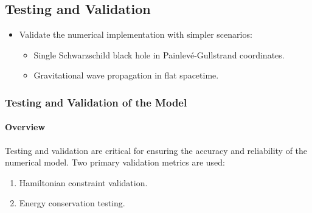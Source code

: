 \documentclass[12pt]{article}
\begin{document}
\subsection{Testing and Validation}
\begin{itemize}
    \item Validate the numerical implementation with simpler scenarios:
    \begin{itemize}
        \item Single Schwarzschild black hole in Painlevé-Gullstrand coordinates.
        \item Gravitational wave propagation in flat spacetime.
    \end{itemize}
\end{itemize}

\subsubsection{Testing and Validation of the Model}

\paragraph{Overview}
Testing and validation are critical for ensuring the accuracy and reliability of the numerical model. Two primary validation metrics are used:
\begin{enumerate}
    \item Hamiltonian constraint validation.
    \item Energy conservation testing.
\end{enumerate}
\end{document}
